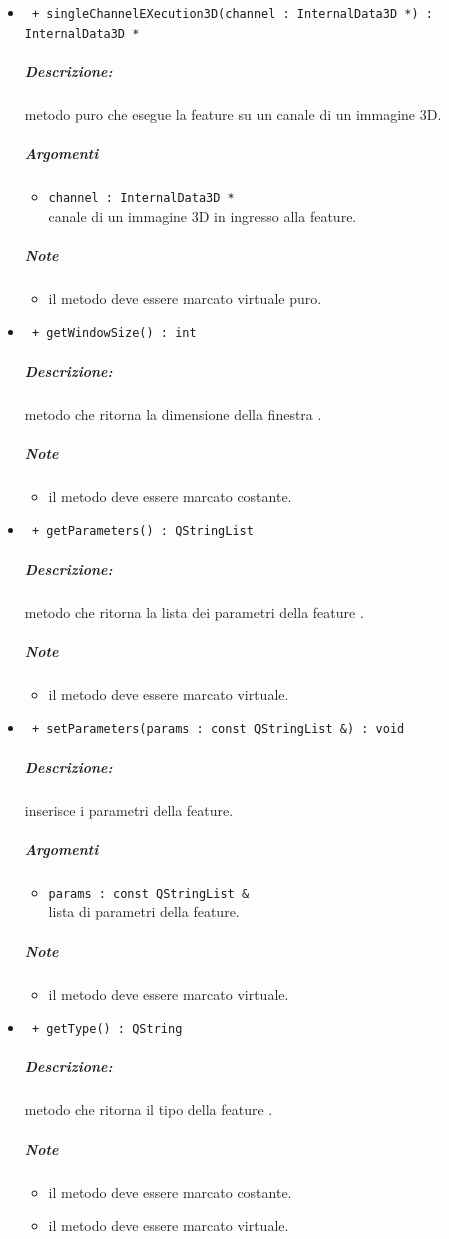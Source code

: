 \begin{itemize}
	\item \color{blue}\verb! + singleChannelEXecution3D(channel : InternalData3D *) : InternalData3D *!
		\color{black}
		\subparagraph{Descrizione:} metodo puro che esegue la feature su un canale di un immagine 3D.
		\subparagraph{Argomenti}
			\begin{itemize}
				\item \color{RoyalPurple} \verb!channel : InternalData3D * ! \\ 
				\color{black} canale di un immagine 3D in ingresso alla feature.		
			\end{itemize}
		\subparagraph{Note}
			\begin{itemize}
				\item il metodo deve essere marcato virtuale puro.
			\end{itemize}
			
	\item \color{blue}\verb! + getWindowSize() : int!
		\color{black}
		\subparagraph{Descrizione:} metodo che ritorna la dimensione della finestra .
		\subparagraph{Note}
			\begin{itemize}
				\item il metodo deve essere marcato costante.
			\end{itemize}
			
	\item \color{blue}\verb! + getParameters() : QStringList!
		\color{black}
		\subparagraph{Descrizione:} metodo che ritorna la lista dei parametri della feature\g{} .
		\subparagraph{Note}
			\begin{itemize}
				\item il metodo deve essere marcato virtuale.
			\end{itemize}
			
	\item \color{blue}\verb! + setParameters(params : const QStringList &) : void!
		\color{black}
		\subparagraph{Descrizione:} inserisce i parametri della feature\g{}.
		\subparagraph{Argomenti}
			\begin{itemize}
				\item \color{RoyalPurple} \verb!params : const QStringList & ! \\ 
				\color{black} lista di parametri della feature.		
			\end{itemize}
		\subparagraph{Note}
			\begin{itemize}
				\item il metodo deve essere marcato virtuale.
			\end{itemize}
			
	\item \color{blue}\verb! + getType() : QString!
		\color{black}
		\subparagraph{Descrizione:} metodo che ritorna il tipo della feature\g{} .
		\subparagraph{Note}
			\begin{itemize}
				\item il metodo deve essere marcato costante.
				\item il metodo deve essere marcato virtuale.
			\end{itemize}
			
	\end{itemize}


